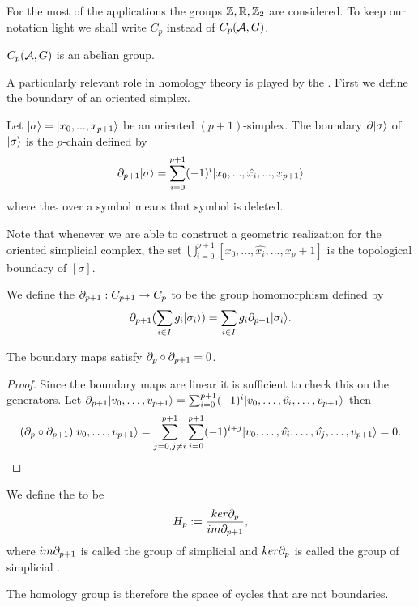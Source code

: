 \documentclass[../1.tex]{subfiles}
\begin{document}
    For the most of the applications the groups $\mathbb{Z},\mathbb{R},\mathbb{Z}_2$ are considered. To keep our notation light we shall write $C_p$ instead of $C_p(\mathcal{A},G)$.

    \begin{prop}
        $C_p(\mathcal{A},G)$ is an abelian group.
    \end{prop}

    A particularly relevant role in homology theory is played by the . First we define the boundary of an oriented simplex.

    \begin{defn}
        Let $| \sigma \rangle = | x_0,...,x_{p+1} \rangle$ be an oriented $(p+1)$-simplex. The boundary $\partial| \sigma \rangle$ of $| \sigma \rangle$ is the $p$-chain
        defined by \[ \partial_{p+1}| \sigma \rangle = \sum_{i = 0}^{p+1}(-1)^i| x_0,...,\hat{x_i},...,x_{p+1} \rangle\]
        where the  $\hat{}$  over a symbol means that symbol is deleted.
    \end{defn}

    \begin{rem}
        Note that whenever we are able to construct a geometric realization for the oriented simplicial complex, the set $\bigcup_{i = 0}^{p+1}[x_0,...,\hat{x_i},...,x_p+1]$
        is the topological boundary of $[\sigma]$.
    \end{rem}
    
    \begin{defn}
        We define the  $\partial_{p+1} : C_{p+1} \to C_p$ to be the group homomorphism defined by
        \[ \partial_{p+1}(\sum_{i \in I}g_i| \sigma_i \rangle) = \sum_{i \in I}g_i\partial_{p+1}| \sigma_i \rangle .\]
    \end{defn}

    \begin{thm}
        The boundary maps satisfy $\partial_p \circ \partial_{p+1} = 0$.
    \end{thm}
    \begin{proof}
        Since the boundary maps are linear it is sufficient to check this on the generators.
        Let $\partial_{p+1}| v_0,\dots,v_{p+1} \rangle = \sum_{i=0}^{p+1} (-1)^i| v_0,\dots,\hat{v_i},\dots,v_{p+1} \rangle$ then 
        \[(\partial_p \circ \partial_{p+1})| v_0,\dots,v_{p+1} \rangle = \sum_{j=0, j \neq i}^{p+1} \sum_{i=0}^{p+1} (-1)^{i+j}| v_0,\dots,\hat{v_i},\dots,\hat{v_j},\dots,v_{p+1} \rangle = 0. \qedhere \]     
    \end{proof}

    \begin{defn}
        We define the  to be 
        \[H_p := \frac{ker\partial_p}{im\partial_{p+1}},\] 
        where $im\partial_{p+1}$ is called the group of simplicial  and
        $ker\partial_p$ is called the group of simplicial .
    \end{defn}

    The homology group is therefore the space of cycles that are not boundaries.
\end{document}
